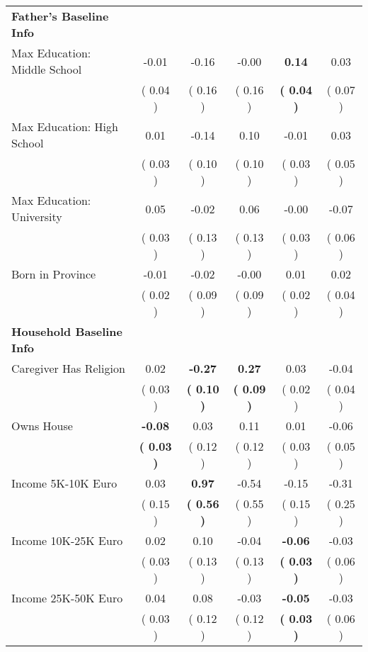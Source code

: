 \begin{table}[H]
{\begin{tabular}{lccccc}
\midrule
\textbf{Father's Baseline Info} \\
\quad Max Education: Middle School &     -0.01 &     -0.16 &     -0.00 & \textbf{     0.14} &      0.03 \\
\quad  & (     0.04 ) & (     0.16 )  & (     0.16 )  & \textbf{(     0.04 )} & (     0.07 ) \\
\quad Max Education: High School &      0.01 &     -0.14 &      0.10 &     -0.01 &      0.03 \\
\quad  & (     0.03 ) & (     0.10 )  & (     0.10 )  & (     0.03 ) & (     0.05 ) \\
\quad Max Education: University &      0.05 &     -0.02 &      0.06 &     -0.00 &     -0.07 \\
\quad  & (     0.03 ) & (     0.13 )  & (     0.13 )  & (     0.03 ) & (     0.06 ) \\
\quad Born in Province &     -0.01 &     -0.02 &     -0.00 &      0.01 &      0.02 \\
\quad  & (     0.02 ) & (     0.09 )  & (     0.09 )  & (     0.02 ) & (     0.04 ) \\
\midrule
\textbf{Household Baseline Info} \\
\quad Caregiver Has Religion &      0.02 & \textbf{    -0.27} & \textbf{     0.27} &      0.03 &     -0.04 \\
\quad  & (     0.03 ) & \textbf{(     0.10 )}  & \textbf{(     0.09 )}  & (     0.02 ) & (     0.04 ) \\
\quad Owns House & \textbf{    -0.08} &      0.03 &      0.11 &      0.01 &     -0.06 \\
\quad  & \textbf{(     0.03 )} & (     0.12 )  & (     0.12 )  & (     0.03 ) & (     0.05 ) \\
\quad Income 5K-10K Euro &      0.03 & \textbf{     0.97} &     -0.54 &     -0.15 &     -0.31 \\
\quad  & (     0.15 ) & \textbf{(     0.56 )}  & (     0.55 )  & (     0.15 ) & (     0.25 ) \\
\quad Income 10K-25K Euro &      0.02 &      0.10 &     -0.04 & \textbf{    -0.06} &     -0.03 \\
\quad  & (     0.03 ) & (     0.13 )  & (     0.13 )  & \textbf{(     0.03 )} & (     0.06 ) \\
\quad Income 25K-50K Euro &      0.04 &      0.08 &     -0.03 & \textbf{    -0.05} &     -0.03 \\
\quad  & (     0.03 ) & (     0.12 )  & (     0.12 )  & \textbf{(     0.03 )} & (     0.06 ) \\

\end{tabular}}
\end{table}
